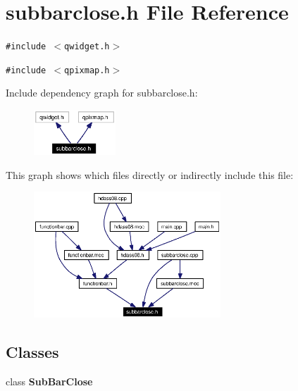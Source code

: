 \section{subbarclose.h File Reference}
\label{subbarclose_8h}


{\tt \#include $<$qwidget.h$>$}\par
{\tt \#include $<$qpixmap.h$>$}\par


Include dependency graph for subbarclose.h:\begin{figure}[H]
\begin{center}
\leavevmode
\includegraphics[width=87pt]{subbarclose_8h__incl}
\end{center}
\end{figure}


This graph shows which files directly or indirectly include this file:\begin{figure}[H]
\begin{center}
\leavevmode
\includegraphics[width=199pt]{subbarclose_8h__dep__incl}
\end{center}
\end{figure}
\subsection*{Classes}
\begin{CompactItemize}
\item 
class {\bf Sub\-Bar\-Close}
\end{CompactItemize}
